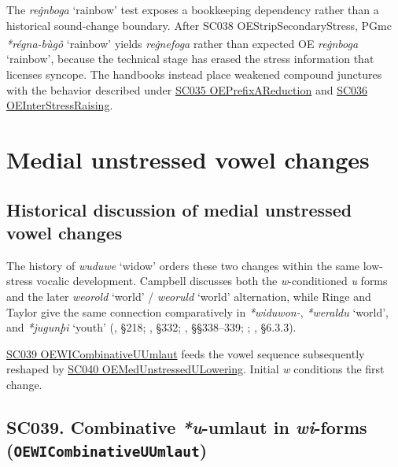 \documentclass[
  british,
  a4paper,
  openany]{book}
\providecommand{\Pred}[1]{\textsuperscript{\dag}\emph{#1}}
\providecommand{\Recon}[1]{\emph{*#1}}
{\catcode`→=\active \global\def→{\ensuremath{\rightarrow}}}
\providecommand{\texorpdfstring}[2]{#1}
\providecommand{\Pred}[1]{\textsuperscript{\dag}\emph{#1}}
\providecommand{\Recon}[1]{\emph{*#1}}
{\catcode`→=\active \global\def→{\ensuremath{\rightarrow}}}
\begin{document}
The \emph{reġnboga} `rainbow' test exposes a bookkeeping dependency
rather than a historical sound-change boundary. After SC038
OEStripSecondaryStress, PGmc \Recon{régna-bùgô} `rainbow' yields
\Pred{reġnefoga} rather than expected OE \emph{reġnboga} `rainbow',
because the technical stage has erased the stress information that
licenses syncope. The handbooks instead place weakened compound
junctures with the behavior described under
\hyperref[rule-OEPrefixAReduction]{SC035 OEPrefixAReduction} and
\hyperref[rule-OEInterStressRaising]{SC036 OEInterStressRaising}.

\newpage

\section{Medial unstressed vowel
changes}\label{medial-unstressed-vowel-changes}

\subsection{Historical discussion of medial unstressed vowel
changes}\label{historical-discussion-of-medial-unstressed-vowel-changes}

The history of \emph{wuduwe} `widow' orders these two changes within the
same low-stress vocalic development. Campbell discusses both the
\emph{w}-conditioned \emph{u} forms and the later \emph{weorold} `world'
/ \emph{weoruld} `world' alternation, while Ringe and Taylor give the
same connection comparatively in \emph{*widuwon-}, \Recon{weraldu}
`world', and \Recon{jugunþi} `youth'
(, §218;
, §332;
, §§338--339;
;
, §6.3.3).

\hyperref[rule-OEWICombinativeUUmlaut]{SC039 OEWICombinativeUUmlaut}
feeds the vowel sequence subsequently reshaped by
\hyperref[rule-OEMedUnstressedULowering]{SC040
OEMedUnstressedULowering}. Initial \emph{w} conditions the first change.

\subsection{\texorpdfstring{SC039. Combinative \emph{*u}-umlaut in
\emph{wi}-forms
(\texttt{OEWICombinativeUUmlaut})}{SC039. Combinative -umlaut in -forms (OEWICombinativeUUmlaut)}}\label{rule-OEWICombinativeUUmlaut}
\end{document}
